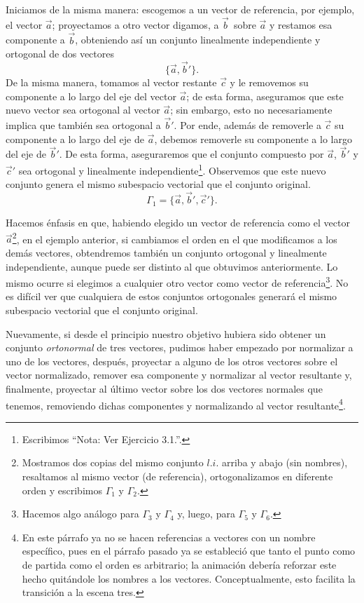 \documentclass[12pt,dvipsnames]{article}
\numberwithin{equation}{section}
\begin{document}
Iniciamos de la misma manera: escogemos a un vector de referencia, por ejemplo, el vector $\vec{a}$; proyectamos a otro vector \textemdash digamos, a $\vec{b}$\textemdash \ sobre $\vec{a}$ y restamos esa componente a $\vec{b}$, obteniendo así un conjunto linealmente independiente y ortogonal de dos vectores\[
\{\vec{a},\vec{b}'\}.
\] De la misma manera, tomamos al vector restante $\vec{c}$ y le removemos su componente a lo largo del eje del vector $\vec{a}$; de esta forma, aseguramos que este nuevo vector sea ortogonal al vector $\vec{a}$; sin embargo, esto no necesariamente implica que también sea ortogonal a $\vec{b}'$. Por ende, además de removerle a $\vec{c}$ su componente a lo largo del eje de $\vec{a}$, debemos removerle su componente a lo largo del eje de $\vec{b}'$. De esta forma, aseguraremos que el conjunto compuesto por $\vec{a}$, $\vec{b}'$ y $\vec{c}'$ sea ortogonal y linealmente independiente\footnote{Escribimos ``Nota: Ver Ejercicio 3.1.''.}. Observemos que este nuevo conjunto genera el mismo subespacio vectorial que el conjunto original.
\[
\Gamma_1 = \{\vec{a},\vec{b}',\vec{c}'\}.
\]

Hacemos énfasis en que, habiendo elegido un vector de referencia \textemdash como el vector $\vec{a}$\footnote{Mostramos dos copias del mismo conjunto $l.i.$ arriba y abajo (sin nombres), resaltamos al mismo vector (de referencia), ortogonalizamos en diferente orden y escribimos $\Gamma_1$ y $\Gamma_2$.}, en el ejemplo anterior\textemdash, si cambiamos el orden en el que modificamos a los demás vectores, obtendremos también un conjunto ortogonal y linealmente independiente, aunque puede ser distinto al que obtuvimos anteriormente. Lo mismo ocurre si elegimos a cualquier otro vector como vector de referencia\footnote{Hacemos algo análogo para $\Gamma_3$ y $\Gamma_4$ y, luego, para $\Gamma_5$ y $\Gamma_6$.}. No es difícil ver que cualquiera de estos conjuntos ortogonales generará el mismo subespacio vectorial que el conjunto original.

Nuevamente, si desde el principio nuestro objetivo hubiera sido obtener un conjunto \emph{ortonormal} de tres vectores, pudimos haber empezado por normalizar a uno de los vectores, después, proyectar a alguno de los otros vectores sobre el vector normalizado, remover esa componente y normalizar al vector resultante y, finalmente, proyectar al último vector sobre los dos vectores normales que tenemos, removiendo dichas componentes y normalizando al vector resultante\footnote{En este párrafo ya no se hacen referencias a vectores con un nombre específico, pues en el párrafo pasado ya se estableció que tanto el punto como de partida como el orden es arbitrario; la animación debería reforzar este hecho quitándole los nombres a los vectores. Conceptualmente, esto facilita la transición a la escena tres.}.
\end{document}
